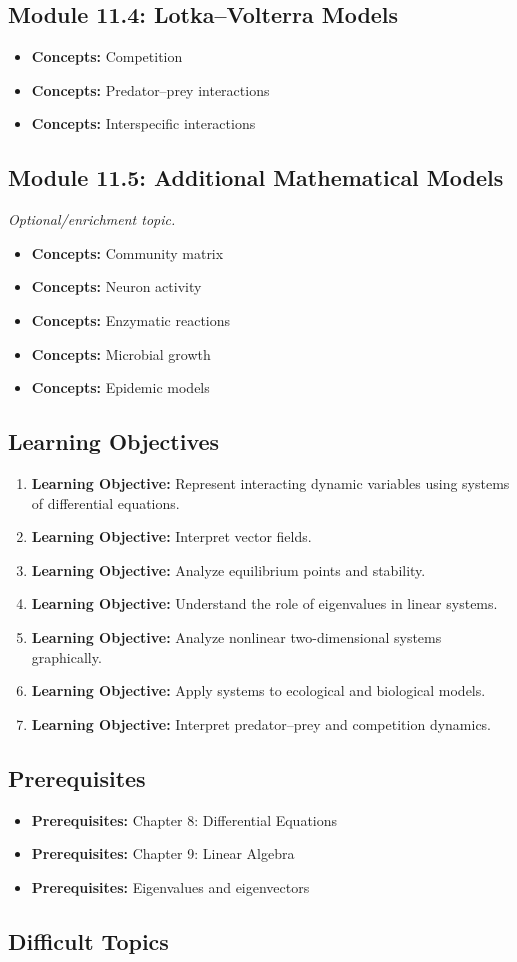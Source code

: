 \documentclass[11pt]{article}
\newcommand{\objective}[1]{\item \textbf{Learning Objective:} #1}
\newcommand{\concept}[1]{\item \textbf{Concepts:} #1}
\newcommand{\prereq}[1]{\item \textbf{Prerequisites:} #1}
\begin{document}
\subsection{Module 11.4: Lotka--Volterra Models}

\begin{itemize}
    \concept{Competition}
    \concept{Predator--prey interactions}
    \concept{Interspecific interactions}
\end{itemize}

\subsection{Module 11.5: Additional Mathematical Models}

\textit{Optional/enrichment topic.}

\begin{itemize}
    \concept{Community matrix}
    \concept{Neuron activity}
    \concept{Enzymatic reactions}
    \concept{Microbial growth}
    \concept{Epidemic models}
\end{itemize}

\subsection{Learning Objectives}

\begin{enumerate}
    \objective{Represent interacting dynamic variables using systems
    of differential equations.}
    \objective{Interpret vector fields.}
    \objective{Analyze equilibrium points and stability.}
    \objective{Understand the role of eigenvalues in linear systems.}
    \objective{Analyze nonlinear two-dimensional systems graphically.}
    \objective{Apply systems to ecological and biological models.}
    \objective{Interpret predator--prey and competition dynamics.}
\end{enumerate}

\subsection{Prerequisites}

\begin{itemize}
    \prereq{Chapter 8: Differential Equations}
    \prereq{Chapter 9: Linear Algebra}
    \prereq{Eigenvalues and eigenvectors}
\end{itemize}

\subsection{Difficult Topics}
\end{document}
